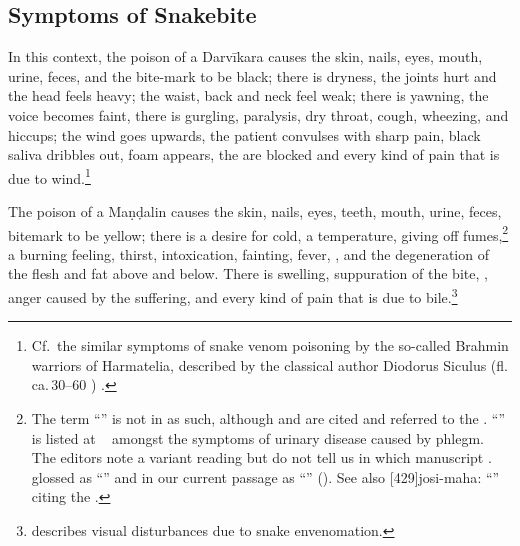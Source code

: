 \begin{translation}
\subsection{Symptoms of Snakebite}

\item[37] 

In this context, the poison of a Darvīkara causes the skin, nails, eyes,
mouth, urine, feces, and the bite-mark to be black; there is dryness, the
joints hurt and the head feels heavy; the waist, back and neck feel weak;
there is yawning, the voice becomes faint, there is gurgling, paralysis,
dry throat, cough, wheezing, and hiccups; the wind goes upwards, the
patient convulses with sharp pain, black saliva dribbles out, foam
appears, the  are blocked and every kind of pain that
is due to wind.\footnote{Cf.\ the similar symptoms of snake venom
    poisoning by the so-called Brahmin warriors of Harmatelia, described by
    the classical author Diodorus Siculus (fl.\,ca.\,30--60 \BCE)
    \citep[108]{egge-1975}.}


The poison of a Maṇḍalin causes the skin, nails, eyes, teeth, mouth,
urine, feces, bitemark  to be yellow; there is a desire for cold, a
temperature, giving off fumes,\footnote{The term
    “” is not in \cite[596]{moni-sans} as
    such, although  and  
    are
    cited and referred to the \SS. “” is
    listed at \SS\  amongst the symptoms of urinary disease
    caused by phlegm. The editors note a variant reading 
    but do not tell us in which manuscript \citep[291, n.\,3]{vulgate}.
     glossed  as
    “” and in our current passage as
    “” (\cite[573]{vulgate}).
    See also [429]{josi-maha}:  “” citing the \SS.} a burning feeling, thirst,
    intoxication, fainting, fever, , and the
    degeneration of the flesh and fat above and below. There is swelling,
    suppuration of the bite, , anger 
    caused by the suffering, and every kind of pain that is due to 
    bile.\footnote{\citet{ghos-2023} describes visual disturbances due to snake 
    envenomation.}


\end{translation}
